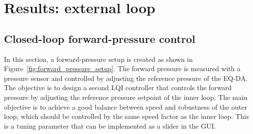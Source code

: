 \documentclass[12pt,a4paper]{article}
\begin{document}
\clearpage
\section{Results: external loop}
\subsection{Closed-loop forward-pressure control}
In this section, a forward-pressure setup is created as shown in Figure~\ref{fig:forward_pressure_setup}. The forward pressure is measured with a pressure sensor and controlled by adjusting the reference pressure of the EQ-DA. The objective is to design a second LQI controller that controls the forward pressure by adjusting the reference pressure setpoint of the inner loop. The main objective is to achieve a good balance between speed and robustness of the outer loop, which should be controlled by the same speed factor as the inner loop. This is a tuning parameter that can be implemented as a slider in the GUI. 
\end{document}
